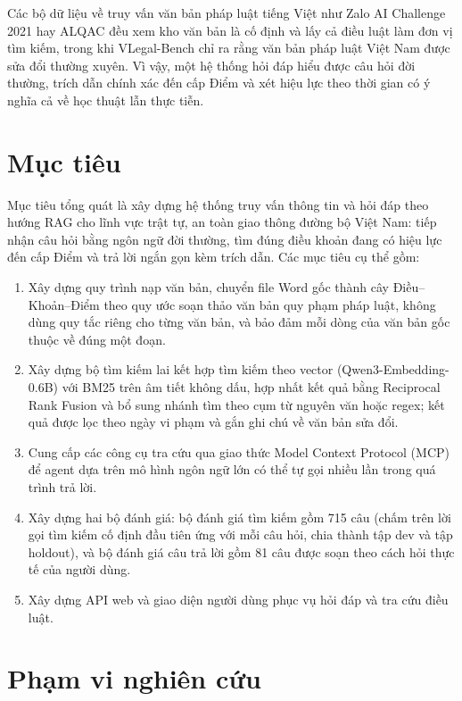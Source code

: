 Các bộ dữ liệu về truy vấn văn bản pháp luật tiếng Việt như Zalo AI Challenge 2021 \cite{zalo2021legal} hay ALQAC \cite{nguyen2021alqac,nguyen2022alqac,nguyen2023alqac} đều xem kho văn bản là cố định và lấy cả điều luật làm đơn vị tìm kiếm, trong khi VLegal-Bench \cite{dong2025vlegalbench} chỉ ra rằng văn bản pháp luật Việt Nam được sửa đổi thường xuyên. Vì vậy, một hệ thống hỏi đáp hiểu được câu hỏi đời thường, trích dẫn chính xác đến cấp Điểm và xét hiệu lực theo thời gian có ý nghĩa cả về học thuật lẫn thực tiễn.

\section{Mục tiêu}
\label{sec:c1_muc_tieu}

Mục tiêu tổng quát là xây dựng hệ thống truy vấn thông tin và hỏi đáp theo hướng RAG cho lĩnh vực trật tự, an toàn giao thông đường bộ Việt Nam: tiếp nhận câu hỏi bằng ngôn ngữ đời thường, tìm đúng điều khoản đang có hiệu lực đến cấp Điểm và trả lời ngắn gọn kèm trích dẫn. Các mục tiêu cụ thể gồm:

\begin{enumerate}
    \item Xây dựng quy trình nạp văn bản, chuyển file Word gốc thành cây Điều--Khoản--Điểm theo quy ước soạn thảo văn bản quy phạm pháp luật, không dùng quy tắc riêng cho từng văn bản, và bảo đảm mỗi dòng của văn bản gốc thuộc về đúng một đoạn.
    \item Xây dựng bộ tìm kiếm lai kết hợp tìm kiếm theo vector (Qwen3-Embedding-0.6B) với BM25 trên âm tiết không dấu, hợp nhất kết quả bằng Reciprocal Rank Fusion và bổ sung nhánh tìm theo cụm từ nguyên văn hoặc regex; kết quả được lọc theo ngày vi phạm và gắn ghi chú về văn bản sửa đổi.
    \item Cung cấp các công cụ tra cứu qua giao thức Model Context Protocol (MCP) để agent dựa trên mô hình ngôn ngữ lớn có thể tự gọi nhiều lần trong quá trình trả lời.
    \item Xây dựng hai bộ đánh giá: bộ đánh giá tìm kiếm gồm 715 câu (chấm trên lời gọi tìm kiếm cố định đầu tiên ứng với mỗi câu hỏi, chia thành tập dev và tập holdout), và bộ đánh giá câu trả lời gồm 81 câu được soạn theo cách hỏi thực tế của người dùng.
    \item Xây dựng API web và giao diện người dùng phục vụ hỏi đáp và tra cứu điều luật.
\end{enumerate}

\section{Phạm vi nghiên cứu}
\label{sec:c1_pham_vi}

